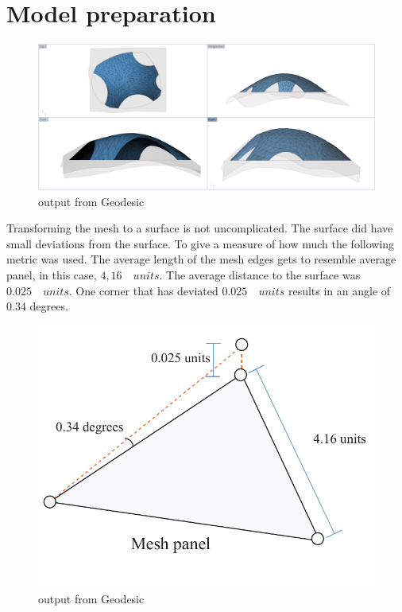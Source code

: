 \section{Model preparation}



\begin{figure}[H]
\centering
\includegraphics[width=1.0\linewidth ]{figure/Results/surfaMesh.png}
\caption{output from Geodesic}
\end{figure}

Transforming the mesh to a surface is not uncomplicated. The surface did have small deviations from the surface. To give a measure of how much the following metric was used. The average length of the mesh edges gets to resemble average panel, in this case, $4,16 \quad units$. The average distance to the surface was $0.025 \quad units$. One corner that has deviated $0.025 \quad units$ results in an angle of  $0.34$ degrees.

\begin{figure}[H]
\centering
\includegraphics[width=0.7\linewidth ]{figure/Results/devianceSurf.pdf}
\caption{output from Geodesic}
\end{figure}




